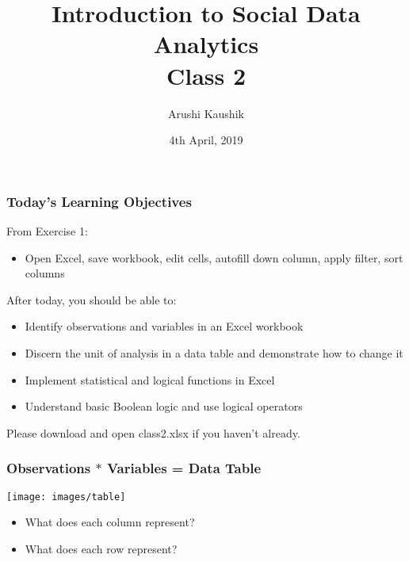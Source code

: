 \documentclass[11pt]{beamer}
\title[Class 2]{Introduction to Social Data Analytics \\
\bigskip Class 2}
\author[Kaushik]{Arushi Kaushik}
\institute[UCSD]{Department of Economics\\ UCSD}
\date{4th April, 2019}
\begin{document}
\frame{\titlepage}


\begin{frame}
 \frametitle{Today's Learning Objectives}
 From Exercise 1: 
 \begin{itemize}
 	\item Open Excel, save workbook, edit cells, autofill down column, apply filter, sort columns
\end{itemize} \pause
\bigskip
 After today, you should be able to:
\begin{itemize}
	\item Identify observations and variables in an Excel workbook
	\item Discern the unit of analysis in a data table and demonstrate how to change it
	\item Implement statistical and logical functions in Excel
	\item Understand basic Boolean logic and use logical operators
\end{itemize} \pause \bigskip
Please download and open class2.xlsx if you haven't already.
\end{frame}

\begin{frame}
\frametitle{Observations $*$ Variables = Data Table}
\begin{center}
\texttt{[image: images/table]}
\end{center}
\begin{itemize}\pause
\item What does each column represent?\pause
\item What does each row represent? 
\end{itemize}
\end{frame}
\end{document}
